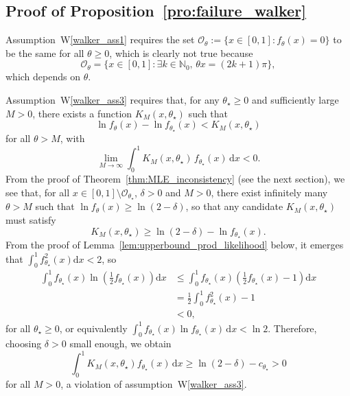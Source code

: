 \documentclass[11pt,twoside]{article}
\newcommand{\Wref}[1]{W\ref{#1}}
\def\NN{\mathbb{N}}
\begin{document}
\subsection*{Proof of Proposition~\ref{pro:failure_walker}}%

Assumption~\Wref{walker_ass1} requires the set $\mathcal O_\theta := \{x\in[0,1] : f_\theta(x) = 0\}$ to be the same for all $\theta\geq 0$, which is clearly not true because
%
\begin{equation*}
    \mathcal O_\theta = \{x\in [0,1] : \exists k \in \NN_0, \,\theta x = (2k + 1)\pi\},
\end{equation*}
%
which depends on $\theta$.



Assumption~\Wref{walker_ass3} requires that, for any $\theta_\star\geq 0$ and sufficiently large $M>0$, there exists a function $K_M(x, \theta_\star)$ such that
%
\begin{equation*}
    \ln f_\theta(x) - \ln f_{\theta_\star}(x) < K_M (x, \theta_\star)
\end{equation*}
%
for all $\theta > M$, with
%
\begin{equation*}
    \lim_{M\to \infty}\int_0^1 K_M(x, \theta_\star) \, f_{\theta_\star}(x) \,\mathrm dx < 0.
\end{equation*}
From the proof of Theorem~\ref{thm:MLE_inconsistency} (see the next section), we see that, for all $x\in [0,1]\setminus \mathcal O_{\theta_\star}$, $\delta>0$ and $M>0$, there exist infinitely many $\theta>M$ such that $\ln f_\theta(x)\geq\ln(2-\delta)$, so that any candidate $K_M(x, \theta_\star)$ must satisfy
%
\begin{equation*}
    K_M(x, \theta_\star) \ge \ln(2-\delta) - \ln f_{\theta_\star}(x).
\end{equation*}
%
From the proof of Lemma~\ref{lem:upperbound_prod_likelihood} below, it emerges that $\int_0^1f_{\theta_\star}^2(x)\mathrm dx < 2$, so
%
\begin{align*}
    \int_0^1 f_{\theta_\star}(x)\ln\left(\frac{1}{2} f_{\theta_\star}(x)\right)\mathrm dx & \leq \int_0^1 f_{\theta_\star}(x)\left(\frac{1}{2} f_{\theta_\star}(x)-1\right)\mathrm dx \\
    & = \frac{1}{2}\int_0^1f_{\theta_\star}^2(x) - 1 \\
    & < 0,
\end{align*}
%
for all $\theta_\star\geq 0$, or equivalently $\int_0^1 f_{\theta_\star}(x)\ln f_{\theta_\star}(x) \, \mathrm dx<\ln 2$. Therefore, choosing $\delta>0$ small enough, we obtain
%
\begin{equation*}
    \int_0^1 K_M(x, \theta_\star) f_{\theta_\star}(x)\, \mathrm dx \geq \ln(2-\delta) - c_{\theta_\star} >0
\end{equation*}
%
for all $M>0$, a violation of assumption~\Wref{walker_ass3}.%
\end{document}

